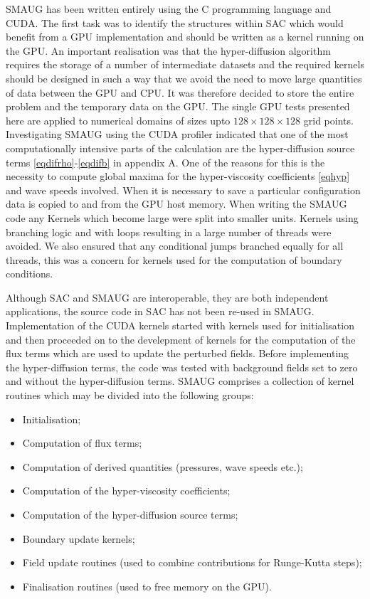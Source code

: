  SMAUG has been written entirely using the C programming language and CUDA. The first task was to identify the structures within SAC which would benefit from a GPU implementation and should be written as a kernel running on the GPU. An important realisation was that the hyper-diffusion algorithm requires the storage of a number of intermediate datasets and the required kernels should be designed in such a way that we avoid the need to move large quantities of data between the GPU and CPU. It was therefore decided to store the entire problem and the temporary data on the GPU.  The single GPU tests presented here are applied to numerical domains of sizes upto   $128\times128\times128$ grid points.
 Investigating SMAUG using the CUDA profiler indicated that one of the most computationally intensive parts of the calculation are the hyper-diffusion source terms \eqref{eqdifrho}-\eqref{eqdifb} in appendix A. One of the reasons for this is the necessity to compute global maxima for the hyper-viscosity coefficients \eqref{eqhyp} and wave speeds involved. When it is necessary to save a particular configuration data is copied to and from the GPU host memory. When writing the SMAUG code any Kernels which become large were split into smaller units. Kernels using branching logic and with loops resulting in a large number of threads were avoided. We also ensured that any conditional jumps branched equally for all threads, this was a concern for kernels used for the computation of boundary conditions.

 Although SAC and SMAUG are interoperable, they are both independent applications, the source code in SAC has not been re-used in SMAUG. Implementation of the CUDA kernels started  with kernels used for initialisation and then proceeded on to the develepment of kernels for the computation of the flux terms which are used to update the perturbed fields. Before implementing the hyper-diffusion terms, the code was tested with background fields set  to zero and without the hyper-diffusion terms.  SMAUG comprises a collection of kernel routines which may be divided into the following groups:
\begin{itemize}
\item    Initialisation;
\item    Computation of flux terms;
\item    Computation of derived quantities (pressures, wave speeds etc.);
\item    Computation of the hyper-viscosity coefficients;
\item    Computation of the hyper-diffusion source terms;
\item    Boundary update kernels;
\item    Field update routines (used to combine contributions for Runge-Kutta steps);
\item    Finalisation routines (used to free memory on the GPU).
\end{itemize}

